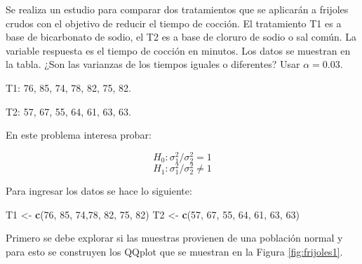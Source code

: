 \documentclass[10pt,]{krantz}
\makeatletter
\newenvironment{Shaded}{\begin{snugshade}}{\end{snugshade}}
\newcommand{\KeywordTok}[1]{\textcolor[rgb]{0.13,0.29,0.53}{\textbf{{#1}}}}
\newcommand{\DecValTok}[1]{\textcolor[rgb]{0.00,0.00,0.81}{{#1}}}
\newcommand{\StringTok}[1]{\textcolor[rgb]{0.31,0.60,0.02}{{#1}}}
\newcommand{\NormalTok}[1]{{#1}}
\newenvironment{kframe}{%
\medskip{}
\setlength{\fboxsep}{.8em}
 \def\at@end@of@kframe{}%
 \ifinner\ifhmode%
  \def\at@end@of@kframe{\end{minipage}}%
  \begin{minipage}{\columnwidth}%
 \fi\fi%
 \def\FrameCommand##1{\hskip\@totalleftmargin \hskip-\fboxsep
 \colorbox{shadecolor}{##1}\hskip-\fboxsep
     \hskip-\linewidth \hskip-\@totalleftmargin \hskip\columnwidth}%
 \MakeFramed {\advance\hsize-\width
   \@totalleftmargin\z@ \linewidth\hsize
   \@setminipage}}%
 {\par\unskip\endMakeFramed%
 \at@end@of@kframe}
\renewenvironment{Shaded}{\begin{kframe}}{\end{kframe}}
\makeatother
\begin{document}
Se realiza un estudio para comparar dos tratamientos que se aplicarán a
frijoles crudos con el objetivo de reducir el tiempo de cocción. El
tratamiento T1 es a base de bicarbonato de sodio, el T2 es a base de
cloruro de sodio o sal común. La variable respuesta es el tiempo de
cocción en minutos. Los datos se muestran en la tabla. ¿Son las
varianzas de los tiempos iguales o diferentes? Usar \(\alpha=0.03\).

T1: 76, 85, 74, 78, 82, 75, 82.

T2: 57, 67, 55, 64, 61, 63, 63.

En este problema interesa probar:

\[H_0: \sigma_1^2 / \sigma_2^2 = 1\]
\[H_1: \sigma_1^2 / \sigma_2^2 \neq 1\]

Para ingresar los datos se hace lo siguiente:

\begin{Shaded}
\begin{Highlighting}[]
\NormalTok{T1 <-}\StringTok{ }\KeywordTok{c}\NormalTok{(}\DecValTok{76}\NormalTok{, }\DecValTok{85}\NormalTok{, }\DecValTok{74}\NormalTok{,}\DecValTok{78}\NormalTok{, }\DecValTok{82}\NormalTok{, }\DecValTok{75}\NormalTok{, }\DecValTok{82}\NormalTok{) }
\NormalTok{T2 <-}\StringTok{ }\KeywordTok{c}\NormalTok{(}\DecValTok{57}\NormalTok{, }\DecValTok{67}\NormalTok{, }\DecValTok{55}\NormalTok{, }\DecValTok{64}\NormalTok{, }\DecValTok{61}\NormalTok{, }\DecValTok{63}\NormalTok{, }\DecValTok{63}\NormalTok{)}
\end{Highlighting}
\end{Shaded}

Primero se debe explorar si las muestras provienen de una población
normal y para esto se construyen los QQplot que se muestran en la Figura
\ref{fig:frijoles1}.
\end{document}
